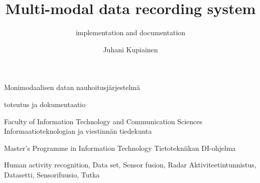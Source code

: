 \documentclass[english, numeric, fleqn]{tauthesis}
\begin{document}

\frontmatter


\title{Multi-modal data recording system}
    {Monimodaalisen datan nauhoitusjärjestelmä}
\subtitle{implementation and documentation}
    {toteutus ja dokumentaatio}

\author{Juhani Kupiainen}


\finishdate{\year}{\month}{\day}


\facultyname
{ Faculty of Information Technology and Communication Sciences }
{ Informaatioteknologian ja viestinnän tiedekunta }

\programmename
{ Master's Programme in Information Technology }
{ Tietotekniikan DI-ohjelma }

\keywords%
    { Human activity recognition, Data set, Sensor fusion, Radar }
    { Aktiviteetintunnistus, Datasetti, Sensorifuusio, Tutka }

\maketitle

\end{document}
